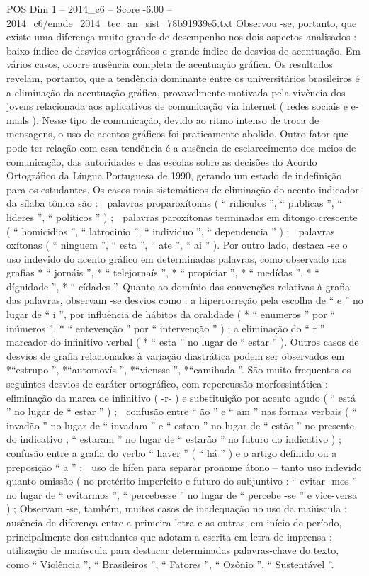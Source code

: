 \begin{textsample}{POS Dim 1 – 2014\_c6 – Score -6.00 – 2014\_c6/enade\_2014\_tec\_an\_sist\_78b91939e5.txt}
Observou -se, portanto, que existe uma diferença muito grande de desempenho nos dois aspectos analisados : baixo índice de desvios ortográficos e grande índice de desvios de acentuação.
Em vários casos, ocorre ausência completa de acentuação gráfica.
Os resultados revelam, portanto, que a tendência dominante entre os universitários brasileiros é a eliminação da acentuação gráfica, provavelmente motivada pela vivência dos jovens relacionada aos aplicativos de comunicação via internet ( redes sociais e e-mails ).
Nesse tipo de comunicação, devido ao ritmo intenso de troca de mensagens, o uso de acentos gráficos foi praticamente abolido.
Outro fator que pode ter relação com essa tendência é a ausência de esclarecimento dos meios de comunicação, das autoridades e das escolas sobre as decisões do Acordo Ortográfico da Língua Portuguesa de 1990, gerando um estado de indefinição para os estudantes.
Os casos mais sistemáticos de eliminação do acento indicador da sílaba tônica são :  palavras proparoxítonas ( “ ridiculos ”, “ publicas ”, “ lideres ”, “ politicos ” ) ;  palavras paroxítonas terminadas em ditongo crescente ( “ homicidios ”, “ latrocinio ”, “ individuo ”, “ dependencia ” ) ;  palavras oxítonas ( “ ninguem ”, “ esta ”, “ ate ”, “ ai ” ).
Por outro lado, destaca -se o uso indevido do acento gráfico em determinadas palavras, como observado nas grafias * “ jornáis ”, * “ telejornaís ”, * “ propíciar ”, * “ medídas ”, * “ dígnidade ”, * “ cídades ”.
Quanto ao domínio das convenções relativas à grafia das palavras, observam -se desvios como : a hipercorreção pela escolha de “ e ” no lugar de “ i ”, por influência de hábitos da oralidade ( * “ enumeros ” por “ inúmeros ”, * “ entevenção ” por “ intervenção ” ) ; a eliminação do “ r ” marcador do infinitivo verbal ( * “ esta ” no lugar de “ estar ” ).
Outros casos de desvios de grafia relacionados à variação diastrática podem ser observados em *“estrupo ”, *“automovís ”, *“viensse ”, *“camihada ”.
São muito frequentes os seguintes desvios de caráter ortográfico, com repercussão morfossintática :  eliminação da marca de infinitivo ( -r- ) e substituição por acento agudo ( “ está ” no lugar de “ estar ” ) ;  confusão entre “ ão ” e “ am ” nas formas verbais ( “ invadão ” no lugar de “ invadam ” e “ estam ” no lugar de “ estão ” no presente do indicativo ; “ estaram ” no lugar de “ estarão ” no futuro do indicativo ) ;  confusão entre a grafia do verbo “ haver ” ( “ há ” ) e o artigo definido ou a preposição “ a ” ;  uso de hífen para separar pronome átono – tanto uso indevido quanto omissão ( no pretérito imperfeito e futuro do subjuntivo : “ evitar -mos ” no lugar de “ evitarmos ”, “ percebesse ” no lugar de “ percebe -se ” e vice-versa ) ; Observam -se, também, muitos casos de inadequação no uso da maiúscula : ausência de diferença entre a primeira letra e as outras, em início de período, principalmente dos estudantes que adotam a escrita em letra de imprensa ; utilização de maiúscula para destacar determinadas palavras-chave do texto, como “ Violência ”, “ Brasileiros ”, “ Fatores ”, “ Ozônio ”, “ Sustentável ”.

\end{textsample}
